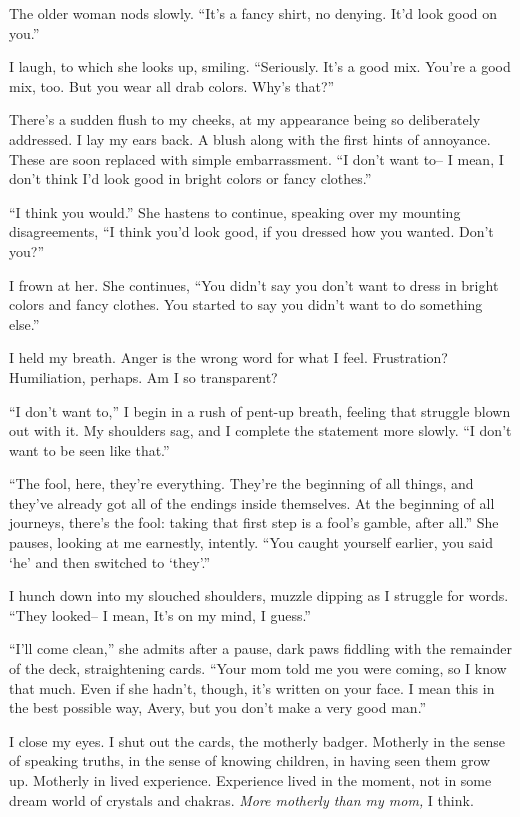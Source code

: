 The older woman nods slowly. ``It's a fancy shirt, no denying. It'd look good on you.''

I laugh, to which she looks up, smiling. ``Seriously. It's a good mix. You're a good mix, too. But you wear all drab colors. Why's that?''

There's a sudden flush to my cheeks, at my appearance being so deliberately addressed. I lay my ears back. A blush along with the first hints of annoyance. These are soon replaced with simple embarrassment. ``I don't want to-- I mean, I don't think I'd look good in bright colors or fancy clothes.''

``I think you would.'' She hastens to continue, speaking over my mounting disagreements, ``I think you'd look good, if you dressed how you wanted. Don't you?''

I frown at her. She continues, ``You didn't say you don't want to dress in bright colors and fancy clothes. You started to say you didn't want to do something else.''

I held my breath. Anger is the wrong word for what I feel. Frustration? Humiliation, perhaps. Am I so transparent?

``I don't want to,'' I begin in a rush of pent-up breath, feeling that struggle blown out with it. My shoulders sag, and I complete the statement more slowly. ``I don't want to be seen like that.''

``The fool, here, they're everything. They're the beginning of all things, and they've already got all of the endings inside themselves. At the beginning of all journeys, there's the fool: taking that first step is a fool's gamble, after all.'' She pauses, looking at me earnestly, intently. ``You caught yourself earlier, you said `he' and then switched to `they'.''

I hunch down into my slouched shoulders, muzzle dipping as I struggle for words. ``They looked-- I mean, It's on my mind, I guess.''

``I'll come clean,'' she admits after a pause, dark paws fiddling with the remainder of the deck, straightening cards. ``Your mom told me you were coming, so I know that much. Even if she hadn't, though, it's written on your face. I mean this in the best possible way, Avery, but you don't make a very good man.''

I close my eyes. I shut out the cards, the motherly badger. Motherly in the sense of speaking truths, in the sense of knowing children, in having seen them grow up. Motherly in lived experience. Experience lived in the moment, not in some dream world of crystals and chakras. \emph{More motherly than my mom,} I think.

